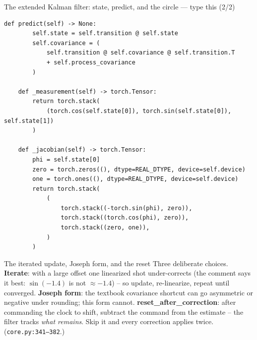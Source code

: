 \documentclass[10pt]{beamer}
\begin{document}
\begin{frame}[fragile]{The extended Kalman filter: state, predict, and the circle --- type this (2/2)}
\begin{lstlisting}[basicstyle=\ttfamily\tiny]
    def predict(self) -> None:
        self.state = self.transition @ self.state
        self.covariance = (
            self.transition @ self.covariance @ self.transition.T
            + self.process_covariance
        )

    def _measurement(self) -> torch.Tensor:
        return torch.stack(
            (torch.cos(self.state[0]), torch.sin(self.state[0]), self.state[1])
        )

    def _jacobian(self) -> torch.Tensor:
        phi = self.state[0]
        zero = torch.zeros((), dtype=REAL_DTYPE, device=self.device)
        one = torch.ones((), dtype=REAL_DTYPE, device=self.device)
        return torch.stack(
            (
                torch.stack((-torch.sin(phi), zero)),
                torch.stack((torch.cos(phi), zero)),
                torch.stack((zero, one)),
            )
        )
\end{lstlisting}
\end{frame}

\begin{frame}{The iterated update, Joseph form, and the reset}
  Three deliberate choices. \textbf{Iterate}: with a large
  offset one linearized shot under-corrects (the comment says
  it best: $\sin(-1.4)$ is not $\approx -1.4$) -- so update,
  re-linearize, repeat until converged. \textbf{Joseph form}:
  the textbook covariance shortcut can go asymmetric or
  negative under rounding; this form cannot.
  \textbf{reset\_after\_correction}: after commanding the
  clock to shift, subtract the command from the estimate --
  the filter tracks \emph{what remains}. Skip it and every
  correction applies twice. (\texttt{core.py:341--382}.)
\end{frame}
\end{document}
